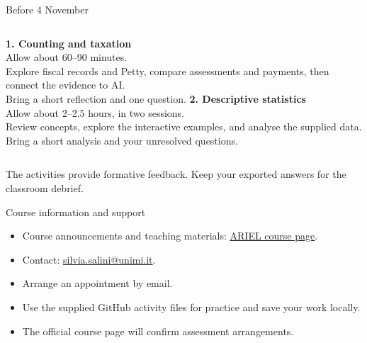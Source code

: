 \begin{frame}{Before 4 November}
\begin{columns}[T]
\textbf{1. Counting and taxation}\\
Allow about 60--90 minutes.\\
Explore fiscal records and Petty, compare assessments and payments, then connect the evidence to AI.\\
Bring a short reflection and one question.
\textbf{2. Descriptive statistics}\\
Allow about 2--2.5 hours, in two sessions.\\
Review concepts, explore the interactive examples, and analyse the supplied data.\\
Bring a short analysis and your unresolved questions.
\end{columns}
\par\vspace{4mm}The activities provide formative feedback. Keep your exported answers for the classroom debrief.
\end{frame}

\begin{frame}{Course information and support}
\begin{itemize}
\item Course announcements and teaching materials: \href{https://myariel.unimi.it/course/view.php?id=3315}{ARIEL course page}.
\item Contact: \href{mailto:silvia.salini@unimi.it}{silvia.salini@unimi.it}.
\item Arrange an appointment by email.
\item Use the supplied GitHub activity files for practice and save your work locally.
\item The official course page will confirm assessment arrangements.
\end{itemize}
\end{frame}

